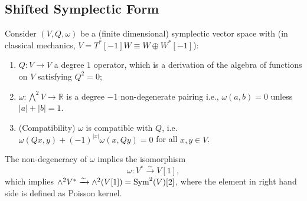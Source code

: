 \documentclass[10pt]{article}
\begin{document}
\subsection{Shifted Symplectic Form}

Consider $(V, Q, \omega)$ be a (finite dimensional) symplectic vector space with (in classical mechanics, $ V = T^{*}[-1]W \equiv W \oplus W^{*}[-1]$):
\begin{enumerate}[(1)]
  \item $ Q: V \rightarrow V$ a degree $ 1$ operator, which is a derivation of the algebra of functions on $ V$ satisfying $ Q^{2} = 0$;
  \item $ \omega : \bigwedge \nolimits^{2} V \rightarrow \mathbb{R}$ is a degree $ -1$ non-degenerate pairing i.e., $\omega(a,b) = 0$ unless $\left| a \right| + \left| b \right| = 1$.
  \item (Compatibility) $ \omega$ is compatible with $ Q$, i.e. $ \omega(Qx, y) + (-1)^{\left| x \right|} \omega(x, Qy) = 0$ for all $ x, y \in V$.
\end{enumerate}
The non-degeneracy of $ \omega$ implies the isomorphism
\begin{equation*}
  \omega: V^{*} \xrightarrow{\sim } V[1],
\end{equation*}
which implies $\wedge^{2} V^{*} \xrightarrow{\sim } \wedge^{2}(V[1]) = \operatorname{Sym}^{2}(V)[2]$, where the element in right hand side is defined as Poisson kernel.
\end{document}
